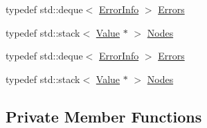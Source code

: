 \begin{DoxyCompactItemize}
typedef std\-::deque$<$ \hyperlink{classJson_1_1Reader_1_1ErrorInfo}{Error\-Info} $>$ \hyperlink{classJson_1_1Reader_aae51e8f5bab3f067261c842a3ef858e5}{Errors}
\item 
typedef std\-::stack$<$ \hyperlink{classJson_1_1Value}{Value} $\ast$ $>$ \hyperlink{classJson_1_1Reader_ad98d0ea4f3576ea83947c1b2b7b2f261}{Nodes}
\item 
typedef std\-::deque$<$ \hyperlink{classJson_1_1Reader_1_1ErrorInfo}{Error\-Info} $>$ \hyperlink{classJson_1_1Reader_aae51e8f5bab3f067261c842a3ef858e5}{Errors}
\item 
typedef std\-::stack$<$ \hyperlink{classJson_1_1Value}{Value} $\ast$ $>$ \hyperlink{classJson_1_1Reader_ad98d0ea4f3576ea83947c1b2b7b2f261}{Nodes}
\end{DoxyCompactItemize}
\subsection*{Private Member Functions}
